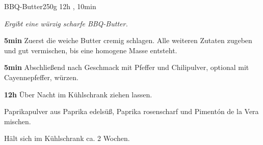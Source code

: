 \documentclass[../recipe-collections/cooking.tex]{subfiles}
\begin{document}
\begin{recipe}{BBQ-Butter}{250g }{12h , 10min }

  \freeform{}\textit{Ergibt eine würzig scharfe BBQ-Butter.}


  \textbf{5min}
  Zuerst die weiche Butter cremig schlagen.
  Alle weiteren Zutaten zugeben und gut vermischen, bis eine homogene Masse entsteht.


  \textbf{5min}
  Abschließend nach Geschmack mit Pfeffer und Chilipulver, optional mit Cayennepfeffer, würzen.

  \newstep{}\textbf{12h}
  Über Nacht im Kühlschrank ziehen lassen.

  \freeform{}\hrulefill{}

  \freeform{}
  Paprikapulver aus Paprika edelsüß, Paprika rosenscharf und Pimentón de la Vera mischen.

  \freeform{}
  Hält sich im Kühlschrank ca. 2 Wochen.

\end{recipe}
\end{document}

